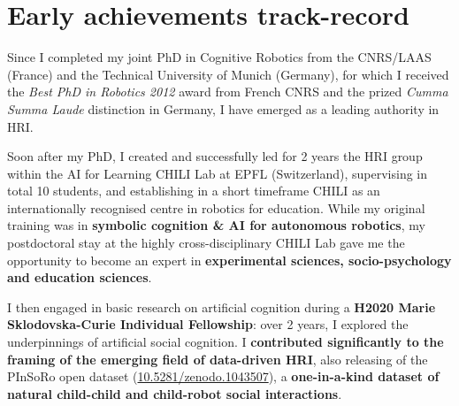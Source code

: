 \newpage
\chapter{Early achievements track-record}\label{early-achievements-track-record}



Since I completed my joint PhD in Cognitive Robotics from the CNRS/LAAS (France) and the
Technical University of Munich (Germany), for which I received the \emph{Best
PhD in Robotics 2012} award from French CNRS and the prized \emph{Cumma Summa
Laude} distinction in Germany, I have emerged as a leading authority in
HRI.

Soon after my PhD, I created and successfully led for 2 years the HRI group
within the AI for Learning CHILI Lab at EPFL (Switzerland), supervising in total
10 students, and establishing in a short timeframe CHILI as an internationally
recognised centre in robotics for education. While my original training was in
\textbf{symbolic cognition \& AI for autonomous robotics}, my postdoctoral stay
at the highly cross-disciplinary CHILI Lab gave me the opportunity to become an
expert in \textbf{experimental sciences, socio-psychology and education
sciences}.

I then engaged in basic research on artificial cognition during a \textbf{H2020 Marie
Sklodovska-Curie Individual Fellowship}: over 2 years, I explored the underpinnings of
artificial social cognition. I \textbf{contributed significantly to the framing
of the emerging field of data-driven HRI}, also releasing of the PInSoRo open
dataset (\href{https://doi.org/10.5281/zenodo.1043507}{10.5281/zenodo.1043507}),
a \textbf{one-in-a-kind dataset of natural child-child and child-robot social
interactions}.

